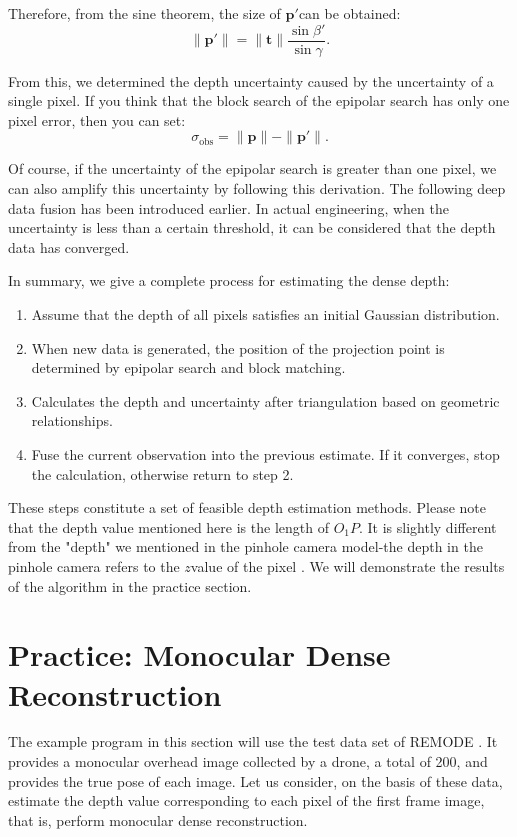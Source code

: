 Therefore, from the sine theorem, the size of $\bm{p}'$can be obtained:
\begin{equation}
\| \bm{p}' \|=\| \bm{t} \| \frac{{\sin \beta'}}{{\sin \gamma }}.
\end{equation}

From this, we determined the depth uncertainty caused by the uncertainty of a single pixel. If you think that the block search of the epipolar search has only one pixel error, then you can set:
\begin{equation}
\sigma_{\mathrm{obs}}=\| \bm{p} \|-\| \bm{p}'\|.
\end{equation}

Of course, if the uncertainty of the epipolar search is greater than one pixel, we can also amplify this uncertainty by following this derivation. The following deep data fusion has been introduced earlier. In actual engineering, when the uncertainty is less than a certain threshold, it can be considered that the depth data has converged.

In summary, we give a complete process for estimating the dense depth:
\begin{mdframed}
\begin{enumerate}
\item Assume that the depth of all pixels satisfies an initial Gaussian distribution.
\item When new data is generated, the position of the projection point is determined by epipolar search and block matching.
\item Calculates the depth and uncertainty after triangulation based on geometric relationships.
\item Fuse the current observation into the previous estimate. If it converges, stop the calculation, otherwise return to step 2.
\end{enumerate}
\end{mdframed}

These steps constitute a set of feasible depth estimation methods. Please note that the depth value mentioned here is the length of $O_1 P $. It is slightly different from the "depth" we mentioned in the pinhole camera model-the depth in the pinhole camera refers to the $z $value of the pixel . We will demonstrate the results of the algorithm in the practice section.

\section{Practice: Monocular Dense Reconstruction}
The example program in this section will use the test data set of REMODE \textsuperscript{\cite{Handa2012, Pizzoli2014}}. It provides a monocular overhead image collected by a drone, a total of 200, and provides the true pose of each image. Let us consider, on the basis of these data, estimate the depth value corresponding to each pixel of the first frame image, that is, perform monocular dense reconstruction.


